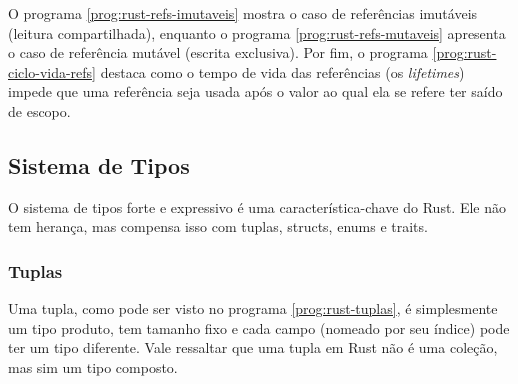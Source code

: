 O programa \ref{prog:rust-refs-imutaveis} mostra o caso de referências imutáveis (leitura compartilhada), enquanto o programa \ref{prog:rust-refs-mutaveis} apresenta o caso de referência mutável (escrita exclusiva). Por fim, o programa \ref{prog:rust-ciclo-vida-refs} destaca como o tempo de vida das referências (os \emph{lifetimes}) impede que uma referência seja usada após o valor ao qual ela se refere ter saído de escopo.

\begin{program}
  
  \caption{Referências imutáveis.\label{prog:rust-refs-imutaveis}}
\end{program}

\begin{program}
  
  \caption{Referências mutáveis.\label{prog:rust-refs-mutaveis}}
\end{program}

\begin{program}
  
  \caption{Ciclo de vida de referências.\label{prog:rust-ciclo-vida-refs}}
\end{program}

\subsection{Sistema de Tipos}

O sistema de tipos forte e expressivo é uma característica-chave do Rust. Ele não tem herança, mas compensa isso com tuplas, structs, enums e traits.

\subsubsection{Tuplas}

Uma tupla, como pode ser visto no programa \ref{prog:rust-tuplas}, é simplesmente um tipo produto, tem tamanho fixo e cada campo (nomeado por seu índice) pode ter um tipo diferente. Vale ressaltar que uma tupla em Rust não é uma coleção, mas sim um tipo composto.

\begin{program}
  
  \caption{Declaração e uso de tuplas.\label{prog:rust-tuplas}}
\end{program}


